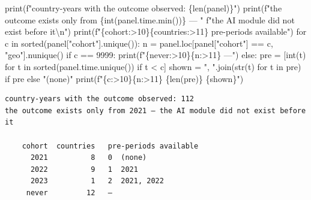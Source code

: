 \documentclass[
  letterpaper,
  10pt,
  twoside,
  openright,
  numbers=noenddot,
  chapterprefix=true]{scrbook}
\newenvironment{Shaded}{}{}
\newcommand{\BuiltInTok}[1]{\textcolor[rgb]{0.84,0.23,0.29}{#1}}
\newcommand{\CharTok}[1]{\textcolor[rgb]{0.01,0.18,0.38}{#1}}
\newcommand{\ControlFlowTok}[1]{\textcolor[rgb]{0.84,0.23,0.29}{#1}}
\newcommand{\DecValTok}[1]{\textcolor[rgb]{0.00,0.36,0.77}{#1}}
\newcommand{\KeywordTok}[1]{\textcolor[rgb]{0.84,0.23,0.29}{#1}}
\newcommand{\NormalTok}[1]{\textcolor[rgb]{0.14,0.16,0.18}{#1}}
\newcommand{\OperatorTok}[1]{\textcolor[rgb]{0.14,0.16,0.18}{#1}}
\newcommand{\SpecialCharTok}[1]{\textcolor[rgb]{0.00,0.36,0.77}{#1}}
\newcommand{\SpecialStringTok}[1]{\textcolor[rgb]{0.01,0.18,0.38}{#1}}
\newcommand{\StringTok}[1]{\textcolor[rgb]{0.01,0.18,0.38}{#1}}
\begin{document}
\begin{Shaded}
\begin{Highlighting}[]
\BuiltInTok{print}\NormalTok{(}\SpecialStringTok{f"country{-}years with the outcome observed: }\SpecialCharTok{\{}\BuiltInTok{len}\NormalTok{(panel)}\SpecialCharTok{\}}\SpecialStringTok{"}\NormalTok{)}
\BuiltInTok{print}\NormalTok{(}\SpecialStringTok{f"the outcome exists only from }\SpecialCharTok{\{}\BuiltInTok{int}\NormalTok{(panel.time.}\BuiltInTok{min}\NormalTok{())}\SpecialCharTok{\}}\SpecialStringTok{ — "}
      \SpecialStringTok{f"the AI module did not exist before it}\CharTok{\textbackslash{}n}\SpecialStringTok{"}\NormalTok{)}
\BuiltInTok{print}\NormalTok{(}\SpecialStringTok{f"}\SpecialCharTok{\{}\StringTok{\textquotesingle{}cohort\textquotesingle{}}\SpecialCharTok{:\textgreater{}10\}\{}\StringTok{\textquotesingle{}countries\textquotesingle{}}\SpecialCharTok{:\textgreater{}11\}}\SpecialStringTok{   pre{-}periods available"}\NormalTok{)}
\ControlFlowTok{for}\NormalTok{ c }\KeywordTok{in} \BuiltInTok{sorted}\NormalTok{(panel[}\StringTok{"cohort"}\NormalTok{].unique()):}
\NormalTok{    n }\OperatorTok{=}\NormalTok{ panel.loc[panel[}\StringTok{"cohort"}\NormalTok{] }\OperatorTok{==}\NormalTok{ c, }\StringTok{"geo"}\NormalTok{].nunique()}
    \ControlFlowTok{if}\NormalTok{ c }\OperatorTok{==} \DecValTok{9999}\NormalTok{:}
        \BuiltInTok{print}\NormalTok{(}\SpecialStringTok{f"}\SpecialCharTok{\{}\StringTok{\textquotesingle{}never\textquotesingle{}}\SpecialCharTok{:\textgreater{}10\}\{}\NormalTok{n}\SpecialCharTok{:\textgreater{}11\}}\SpecialStringTok{   —"}\NormalTok{)}
    \ControlFlowTok{else}\NormalTok{:}
\NormalTok{        pre }\OperatorTok{=}\NormalTok{ [}\BuiltInTok{int}\NormalTok{(t) }\ControlFlowTok{for}\NormalTok{ t }\KeywordTok{in} \BuiltInTok{sorted}\NormalTok{(panel.time.unique()) }\ControlFlowTok{if}\NormalTok{ t }\OperatorTok{\textless{}}\NormalTok{ c]}
\NormalTok{        shown }\OperatorTok{=} \StringTok{", "}\NormalTok{.join(}\BuiltInTok{str}\NormalTok{(t) }\ControlFlowTok{for}\NormalTok{ t }\KeywordTok{in}\NormalTok{ pre) }\ControlFlowTok{if}\NormalTok{ pre }\ControlFlowTok{else} \StringTok{"(none)"}
        \BuiltInTok{print}\NormalTok{(}\SpecialStringTok{f"}\SpecialCharTok{\{}\NormalTok{c}\SpecialCharTok{:\textgreater{}10\}\{}\NormalTok{n}\SpecialCharTok{:\textgreater{}11\}}\SpecialStringTok{   }\SpecialCharTok{\{}\BuiltInTok{len}\NormalTok{(pre)}\SpecialCharTok{\}}\SpecialStringTok{  }\SpecialCharTok{\{}\NormalTok{shown}\SpecialCharTok{\}}\SpecialStringTok{"}\NormalTok{)}
\end{Highlighting}
\end{Shaded}

\begin{verbatim}
country-years with the outcome observed: 112
the outcome exists only from 2021 — the AI module did not exist before it

    cohort  countries   pre-periods available
      2021          8   0  (none)
      2022          9   1  2021
      2023          1   2  2021, 2022
     never         12   —
\end{verbatim}
\end{document}

